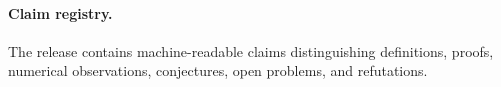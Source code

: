 \paragraph{Claim registry.} The release contains \ClaimCount machine-readable claims distinguishing definitions, proofs, numerical observations, conjectures, open problems, and refutations.
